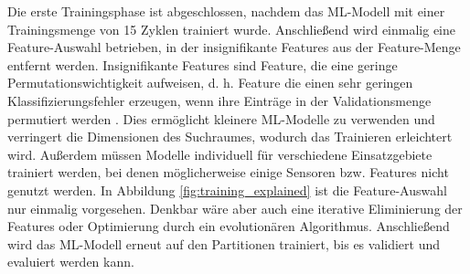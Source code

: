 \newline
Die erste Trainingsphase ist abgeschlossen, nachdem das ML-Modell mit einer Trainingsmenge von 15 Zyklen trainiert wurde.
Anschließend wird einmalig eine Feature-Auswahl betrieben, in der insignifikante Features aus der Feature-Menge entfernt werden.
Insignifikante Features sind Feature, die eine geringe Permutationswichtigkeit aufweisen, d. h. Feature die einen sehr geringen
Klassifizierungsfehler erzeugen, wenn ihre Einträge in der Validationsmenge permutiert werden \cite{breiman2001random}.
Dies ermöglicht kleinere ML-Modelle zu verwenden und verringert die Dimensionen des Suchraumes, wodurch das Trainieren erleichtert wird.
Außerdem müssen Modelle individuell für verschiedene Einsatzgebiete trainiert werden, bei denen möglicherweise einige Sensoren bzw. Features nicht genutzt werden.
In Abbildung \ref{fig:training_explained} ist die Feature-Auswahl nur einmalig vorgesehen.
Denkbar wäre aber auch eine iterative Eliminierung der Features oder Optimierung durch ein evolutionären Algorithmus.
Anschließend wird das ML-Modell erneut auf den Partitionen trainiert, bis es validiert und evaluiert werden kann.